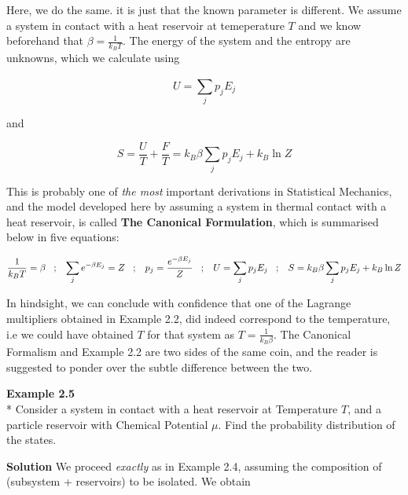 \documentclass[oneside]{book}
\begin{document}
Here, we do the same. it is just that the known parameter is different. We assume a system in contact with a heat reservoir at temeperature $T$ and we know beforehand that
 $\beta = \frac{1}{k_BT}$. The energy of the system and the entropy are unknowns, which we calculate using
 
 \[ U = \sum_{j}^{}p_jE_j\]
 
 and
 
 \[ S = \frac{U}{T} + \frac{F}{T} = k_B\beta\sum_{j}^{}p_jE_j + k_B\ln Z\]
 


This is probably one of \emph{the most} important derivations in Statistical Mechanics, and the model developed here by assuming a system in thermal contact with a heat reservoir, is called \textbf{The Canonical Formulation}, which is summarised below in five equations: \\ 
\begin{mdframed}[style=exercise]
\[\frac{1}{k_BT} = \beta
\hspace{0.3cm};\hspace{0.3cm} 
\sum_{j}^{}e^{-\beta E_j} =  Z      
\hspace{0.3cm};\hspace{0.3cm}
 p_j = \frac{e^{-\beta E_j}}{Z}
\hspace{0.3cm};\hspace{0.3cm}
U = \sum_{j}^{}p_jE_j
\hspace{0.3cm};\hspace{0.3cm}
S = k_B\beta\sum_{j}^{}p_jE_j + k_B\ln Z
\]
\end{mdframed}
In hindsight, we can conclude with confidence that one of the Lagrange multipliers obtained in Example 2.2, did indeed correspond to the temperature, i.e we could have obtained $T$ for that system as 
$T = \frac{1}{k_B\beta}$. The Canonical Formalism and Example 2.2 are two sides of the same coin, and the reader is suggested to ponder over the subtle difference between the two.

 \begin{mdframed}[style=exercise]
\textbf{Example 2.5}
 \\* 
 Consider a system in contact with a heat reservoir at Temperature $T$, and a particle reservoir with Chemical Potential $\mu$. Find the probability distribution of the states.
 \end{mdframed}
\textbf{Solution} We proceed \emph{exactly} as in Example 2.4, assuming the composition of (subsystem + reservoirs) to be isolated. We obtain
\end{document}
